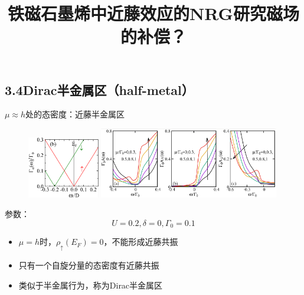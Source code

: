 \documentclass[9pt,t]{beamer} %
\begin{document}
\subsection{3.4Dirac半金属区（half-metal）}
\title{铁磁石墨烯中近藤效应的NRG研究\qquad \qquad \qquad \qquad 磁场的补偿？}
\begin{frame}{$\mu\approx h$处的态密度：近藤半金属区}
\begin{figure}
\includegraphics[width=0.28\textwidth,height=0.27\textwidth]{hyb2.png}
\includegraphics[width=0.7\textwidth]{dos-mu=h.png}
\end{figure}
参数：
\[U=0.2,\delta=0,\Gamma_{0}=0.1\]
\begin{itemize}
\vspace{0.3cm}
\setlength\itemsep{0.5em}
\item $\mu=h$时，$\rho_{\uparrow}(E_{F})=0$，不能形成近藤共振
\item 只有一个自旋分量的态密度有近藤共振
\item 类似于半金属行为，称为Dirac半金属区
\end{itemize}
\end{frame}
\end{document}
